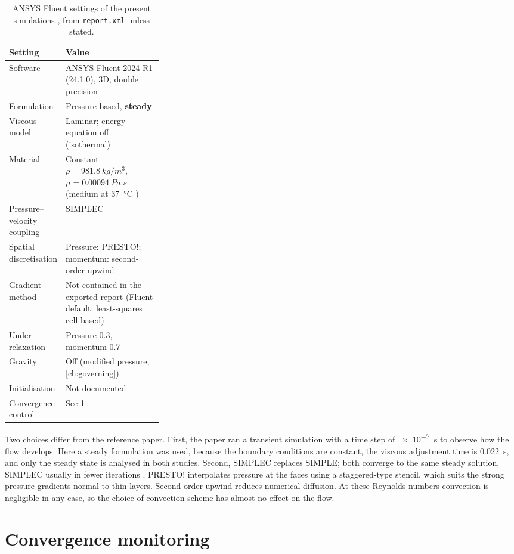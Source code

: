 \begin{table}[htbp]
\centering
\caption{ANSYS Fluent settings of the present simulations \tagC, from \texttt{report.xml} unless stated.}
\label{tab:solver}
\small
\begin{tabularx}{\linewidth}{@{}p{0.3\linewidth}X@{}}
\toprule
Setting & Value\\
\midrule
Software & ANSYS Fluent 2024 R1 (24.1.0), 3D, double precision\\
Formulation & Pressure-based, \textbf{steady}\\
Viscous model & Laminar; energy equation off (isothermal)\\
Material & Constant $\rho=\SI{981.8}{kg/m^3}$, $\mu=\SI{0.00094}{Pa.s}$ (medium at \SI{37}{\celsius} \citep{Delon2020})\\
Pressure--velocity coupling & SIMPLEC\\
Spatial discretisation & Pressure: PRESTO!; momentum: second-order upwind\\
Gradient method & Not contained in the exported report (Fluent default: least-squares cell-based)\\
Under-relaxation & Pressure 0.3, momentum 0.7\\
Gravity & Off (modified pressure, \cref{ch:governing})\\
Initialisation & Not documented\\
Convergence control & See \cref{sec:num_convergence}\\
\bottomrule
\end{tabularx}
\end{table}

Two choices differ from the reference paper. First, the paper ran a transient simulation with a time step of \SI{e-7}{s} to observe how the flow develops. Here a steady formulation was used, because the boundary conditions are constant, the viscous adjustment time is \SI{0.022}{s}, and only the steady state is analysed in both studies. Second, SIMPLEC replaces SIMPLE; both converge to the same steady solution, SIMPLEC usually in fewer iterations \citep{Patankar1980,Fluent2024}. PRESTO! interpolates pressure at the faces using a staggered-type stencil, which suits the strong pressure gradients normal to thin layers. Second-order upwind reduces numerical diffusion. At these Reynolds numbers convection is negligible in any case, so the choice of convection scheme has almost no effect on the flow.

\section{Convergence monitoring}
\label{sec:num_convergence}


